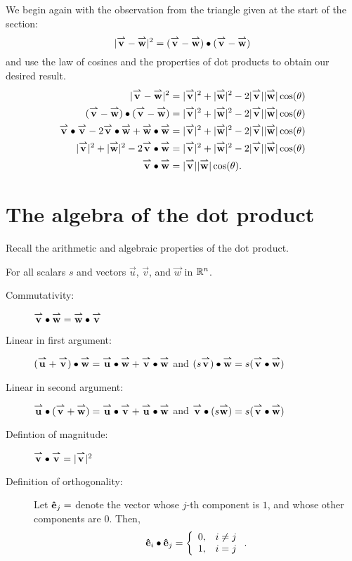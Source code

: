 \documentclass{ximera}
\begin{document}
    \begin{explanation}
 We begin again with the observation from the triangle given at the start of the section:
    \[
    |\vec{v} - \vec{w}|^2 =  (\vec{v} - \vec{w})\dotp(\vec{v} - \vec{w})
    \]
    and use the law of cosines and the properties of dot products to obtain our desired result.
    \begin{align*}
      |\vec{v} - \vec{w}|^2&=|\vec{v}|^2+|\vec{w}|^2-2|\vec{v}||\vec{w}|\cos(\theta)\\
      (\vec{v} - \vec{w})\dotp(\vec{v} - \vec{w}) &=|\vec{v}|^2+|\vec{w}|^2-2|\vec{v}||\vec{w}|\cos(\theta)\\
      \vec{v}\dotp\vec{v} -2\vec{v}\dotp\vec{w}+\vec{w}\dotp\vec{w}&=|\vec{v}|^2+|\vec{w}|^2-2|\vec{v}||\vec{w}|\cos(\theta)\\
      |\vec{v}|^2+|\vec{w}|^2 -2\vec{v}\dotp\vec{w} &=|\vec{v}|^2+|\vec{w}|^2-2|\vec{v}||\vec{w}|\cos(\theta)\\
      \vec{v} \dotp \vec{w} &= |\vec{v}||\vec{w}|\cos(\theta).
    \end{align*}
  \end{explanation}


\section{The algebra of the dot product}

Recall the arithmetic and algebraic properties of the dot product. 

  For all scalars $s$ and vectors  $\vec{u}$, $\vec{v}$, and $\vec{w}$ in $\R^n$.
  \begin{description}
  \item[Commutativity:] $\vec{v} \dotp \vec{w} = \vec{w} \dotp
    \vec{v}$
  \item[Linear in first argument:] $(\vec{u}+\vec{v})\dotp \vec{w} = \vec{u}\dotp \vec{w} +
    \vec{v}\dotp \vec{w}$ and $(s\vec{v})\dotp \vec{w} = s(\vec{v}
    \dotp \vec{w})$
  \item[Linear in second argument:] $\vec{u} \dotp (\vec{v}+\vec{w}) = \vec{u}\dotp \vec{v}+
    \vec{u}\dotp \vec{w}$ and $\vec{v} \dotp (s\vec{w}) = s(\vec{v}
    \dotp \vec{w})$
  \item[Defintion of magnitude:] $\vec{v} \dotp \vec{v} = |\vec{v}|^2$
   \item[Definition of orthogonality:]  Let $\uvec{e}_j =$ denote the vector whose $j$-th component is $1$, and whose other components are $0$. Then, \[\uvec{e}_i \dotp \uvec{e}_j = \left\{ \begin{array}{ll} 0, & i \neq j \\ 1, & i=j \end{array}\right. . \]
  \end{description}
\end{document}
